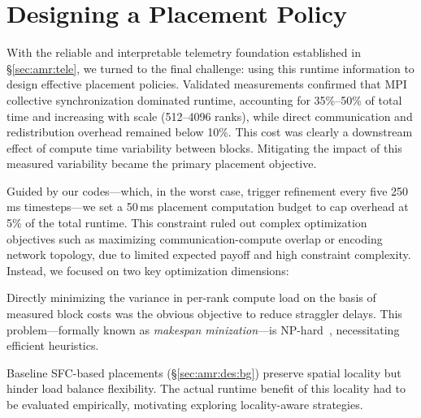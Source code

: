 
\section{Designing a Placement Policy}\label{sec:amr:design}

With the reliable and interpretable telemetry foundation established in \S\ref{sec:amr:tele}, we turned
to the final challenge: using this runtime information to design effective placement policies.
Validated measurements confirmed that MPI collective synchronization dominated runtime, accounting
for 35\%--50\% of total time and increasing with scale (512--4096 ranks), while direct
communication and redistribution overhead remained below 10\%.
This cost was clearly a downstream effect of compute time variability between blocks.
Mitigating the impact of this measured variability became the primary placement objective.

Guided by our codes---which, in the worst case, trigger refinement every five 250\,ms
timesteps---we set a 50\,ms placement computation budget to cap overhead at 5\% of the total
runtime.
This constraint ruled out complex optimization objectives such as maximizing communication-compute
overlap or encoding network topology, due to limited expected payoff and high constraint
complexity.
Instead, we focused on two key optimization dimensions:

 Directly minimizing the variance in per-rank compute load on the basis of measured block
costs was the obvious objective to reduce straggler delays.
This problem---formally known as \emph{makespan minization}---is
NP-hard~\cite{Garey1979:Intractability}, necessitating efficient heuristics.

Baseline SFC-based placements (\S\ref{sec:amr:des:bg}) preserve spatial locality but hinder load
balance flexibility.
The actual runtime benefit of this locality had to be evaluated empirically, motivating exploring
locality-aware strategies.

